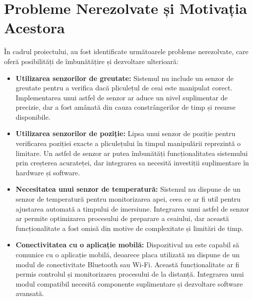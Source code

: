   \section{Probleme Nerezolvate și Motivația Acestora}

    În cadrul proiectului, au fost identificate %
    următoarele probleme nerezolvate, care oferă %
    posibilități de îmbunătățire și dezvoltare %
    ulterioară:
    
    \begin{itemize}
        \item \textbf{Utilizarea senzorilor de greutate:} %
        Sistemul nu include un senzor de greutate %
        pentru a verifica dacă pliculețul de ceai %
        este manipulat corect. Implementarea unui %
        astfel de senzor ar aduce un nivel %
        suplimentar de precizie, dar a fost %
        amânată din cauza constrângerilor de %
        timp și resurse disponibile.  
    
        \item \textbf{Utilizarea senzorilor de poziție:} %
        Lipsa unui senzor de poziție pentru %
        verificarea poziției exacte a %
        pliculețului în timpul manipulării %
        reprezintă o limitare. Un astfel de %
        senzor ar putea îmbunătăți %
        funcționalitatea sistemului prin %
        creșterea acurateței, dar integrarea %
        sa necesită investiții suplimentare %
        în hardware și software.  
    
        \item \textbf{Necesitatea unui senzor de temperatură:} %
        Sistemul nu dispune de un senzor de %
        temperatură pentru monitorizarea apei, %
        ceea ce ar fi util pentru ajustarea %
        automată a timpului de imersiune. %
        Integrarea unui astfel de senzor ar %
        permite optimizarea procesului de %
        preparare a ceaiului, dar această %
        funcționalitate a fost omisă din %
        motive de complexitate și limitări %
        de timp.  
    
        \item \textbf{Conectivitatea cu o aplicație mobilă:} %
        Dispozitivul nu este capabil să %
        comunice cu o aplicație mobilă, %
        deoarece placa utilizată nu dispune %
        de un modul de conectivitate %
        Bluetooth sau Wi-Fi. Această %
        funcționalitate ar fi permis %
        controlul și monitorizarea %
        procesului de la distanță. %
        Integrarea unui modul compatibil %
        necesită componente suplimentare %
        și dezvoltare software avansată.  
    

\end{itemize}
